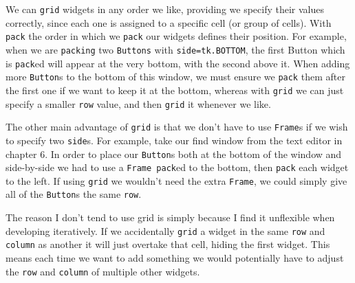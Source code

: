 \documentclass[a4paper,11pt,openany]{book}
\begin{document}
\vspace{5mm}

We can \lstinline[columns=fixed]{grid} widgets in any order we like, providing we specify their values correctly, since each one is assigned to a specific cell (or group of cells). With \lstinline[columns=fixed]{pack} the order in which we \lstinline[columns=fixed]{pack} our widgets defines their position. For example, when we are \lstinline[columns=fixed]{packing} two \lstinline[columns=fixed]{Buttons} with \lstinline[columns=fixed]{side=tk.BOTTOM}, the first Button which is \lstinline[columns=fixed]{pack}ed will appear at the very bottom, with the second above it. When adding more \lstinline[columns=fixed]{Button}s to the bottom of this window, we must ensure we \lstinline[columns=fixed]{pack} them after the first one if we want to keep it at the bottom, whereas with \lstinline[columns=fixed]{grid} we can just specify a smaller \lstinline[columns=fixed]{row} value, and then \lstinline[columns=fixed]{grid} it whenever we like. 

\vspace{5mm}

The other main advantage of \lstinline[columns=fixed]{grid} is that we don't have to use \lstinline[columns=fixed]{Frame}s if we wish to specify two \lstinline[columns=fixed]{side}s. For example, take our find window from the text editor in chapter 6. In order to place our \lstinline[columns=fixed]{Button}s both at the bottom of the window and side-by-side we had to use a \lstinline[columns=fixed]{Frame pack}ed to the bottom, then \lstinline[columns=fixed]{pack} each widget to the left. If using \lstinline[columns=fixed]{grid} we wouldn't need the extra \lstinline[columns=fixed]{Frame}, we could simply give all of the \lstinline[columns=fixed]{Button}s the same \lstinline[columns=fixed]{row}. 
 
\vspace{5mm}

The reason I don't tend to use grid is simply because I find it unflexible when developing iteratively. If we accidentally \lstinline[columns=fixed]{grid} a widget in the same \lstinline[columns=fixed]{row} and \lstinline[columns=fixed]{column} as another it will just overtake that cell, hiding the first widget. This means each time we want to add something we would potentially have to adjust the \lstinline[columns=fixed]{row} and \lstinline[columns=fixed]{column} of multiple other widgets. 

\vspace{5mm}
\end{document}
